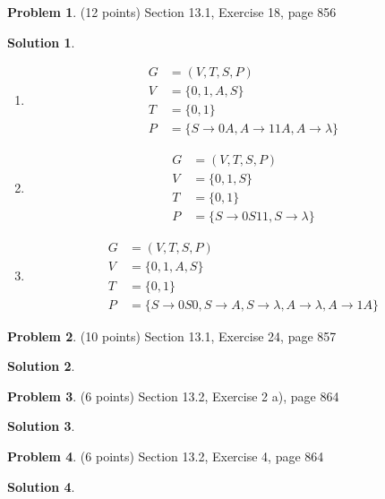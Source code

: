 \documentclass{article}
\theoremstyle{definition}
\newtheorem{problem}{Problem}
\newtheorem*{solution}{Solution}
\begin{document}
\begin{problem} (12 points)
Section 13.1, Exercise 18, page 856
\end{problem}
\begin{solution} \ \\
\begin{enumerate}
    \item
    \begin{align*}
      G &= (V,T,S,P) \\
      V &= \{0,1,A,S\} \\
      T &= \{0,1\} \\
      P &= \{S \rightarrow 0A, A \rightarrow 11A, A \rightarrow \lambda \}
    \end{align*}

    \item
    \begin{align*}
      G &= (V,T,S,P) \\
      V &= \{0,1,S\} \\
      T &= \{0,1\} \\
      P &= \{S \rightarrow 0S11, S \rightarrow \lambda \}
    \end{align*}
    \item
    \begin{align*}
      G &= (V,T,S,P) \\
      V &= \{0,1,A,S\} \\
      T &= \{0,1\} \\
      P &= \{S \rightarrow 0S0, S \rightarrow A, S \rightarrow \lambda, A \rightarrow \lambda, A \rightarrow 1A\}
    \end{align*}

\end{enumerate}
\end{solution}

\begin{problem} (10 points)
Section 13.1, Exercise 24, page 857
\end{problem}
\begin{solution} 
\end{solution}

\begin{problem} (6 points)
Section 13.2, Exercise 2 a), page 864
\end{problem}
\begin{solution} 
\end{solution}

\begin{problem} (6 points)
Section 13.2, Exercise 4, page 864
\end{problem}
\begin{solution} 
\end{solution}
\end{document}
